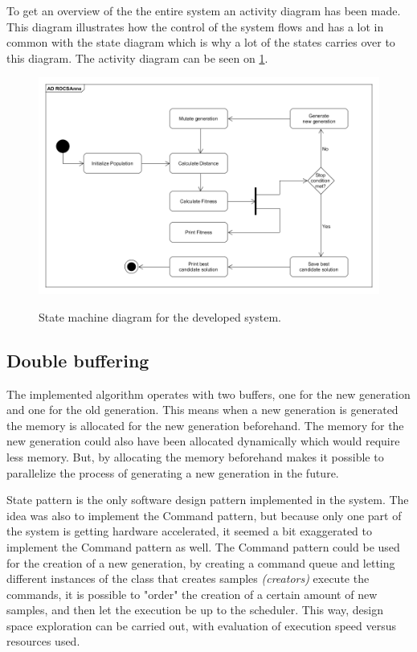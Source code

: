To get an overview of the the entire system an activity diagram has been made. This diagram illustrates how the control of the system flows and has a lot in common with the state diagram which is why a lot of the states carries over to this diagram. The activity diagram can be seen on \cref{fig:Activity_diagram}.

\begin{figure}[H]
	\centering
	{\includegraphics[width=\textwidth]{Images/AD_ROGSAnne.PNG}}\\[0.5cm]
	\caption{State machine diagram for the developed system.}
	\label{fig:Activity_diagram}
\end{figure}



\subsection{Double buffering}
The implemented algorithm operates with two buffers, one for the new generation and one for the old generation. This means when a new generation is generated the memory is allocated for the new generation beforehand. The memory for the new generation could also have been allocated dynamically which would require less memory. But, by allocating the memory beforehand makes it possible to parallelize the process of generating a new generation in the future.

State pattern is the only software design pattern implemented in the system. The idea was also to implement the Command pattern, but because only one part of the system is getting hardware accelerated, it seemed a bit exaggerated to implement the Command pattern as well. The Command pattern could be used for the creation of a new generation, by creating a command queue and letting different instances of the class that creates samples \textit{(creators)} execute the commands, it is possible to "order" the creation of a certain amount of new samples, and then let the execution be up to the scheduler. This way, design space exploration can be carried out, with evaluation of execution speed versus resources used.


